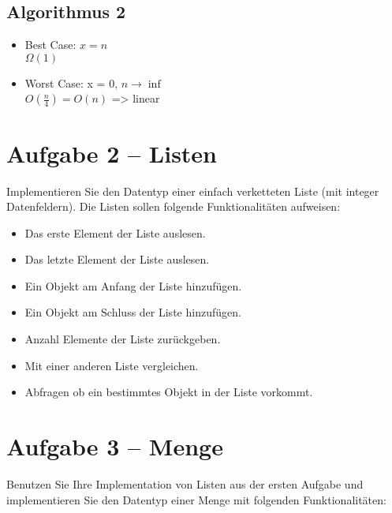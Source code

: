 \subsection*{Algorithmus 2}
\begin{itemize}
	\item Best Case:  $x = n$ \\
		  $\Omega(1)$
	\item Worst Case: x = 0, $n \rightarrow \inf$ \\
		  $O(\frac{n}{4}) = O(n)$ => linear
\end{itemize}

\newpage

\section*{Aufgabe 2 – Listen}
Implementieren Sie den Datentyp einer einfach verketteten Liste (mit integer Datenfeldern). Die Listen sollen folgende Funktionalitäten aufweisen:\\

\begin{itemize}
	\item
		Das erste Element der Liste auslesen.
	\item
		Das letzte Element der Liste auslesen.
	\item
		Ein Objekt am Anfang der Liste hinzufügen.
	\item
		Ein Objekt am Schluss der Liste hinzufügen.
	\item
		Anzahl Elemente der Liste zurückgeben.
	\item
		Mit einer anderen Liste vergleichen.
	\item
		Abfragen ob ein bestimmtes Objekt in der Liste vorkommt.
\end{itemize}




\newpage

\section*{Aufgabe 3 – Menge}
Benutzen Sie Ihre Implementation von Listen aus der ersten Aufgabe und implementieren Sie den Datentyp einer Menge mit folgenden Funktionalitäten:


